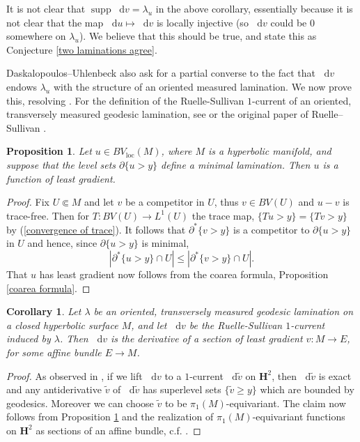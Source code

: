 \documentclass[reqno,12pt,letterpaper]{amsart}
\newcommand{\Hyp}{\mathbf H}
\DeclareMathOperator{\supp}{supp}
\newcommand*\dif{\mathop{}\!\mathrm{d}}
\newcommand{\loc}{\mathrm{loc}}
\newtheorem{proposition}[theorem]{Proposition}
\newtheorem{corollary}[theorem]{Corollary}
\theoremstyle{definition}
\numberwithin{equation}{section}
\begin{document}
It is not clear that $\supp \dif v = \lambda_u$ in the above corollary, essentially because it is not clear that the map $\dif u \mapsto \dif v$ is locally injective (so $\dif v$ could be $0$ somewhere on $\lambda_u$).
We believe that this should be true, and state this as Conjecture \ref{two laminations agree}.

Daskalopoulos--Uhlenbeck also ask for a partial converse to the fact that $\dif v$ endows $\lambda_u$ with the structure of an oriented measured lamination.
We now prove this, resolving \cite[Problem 9.7]{daskalopoulos2020transverse}.
For the definition of the Ruelle-Sullivan $1$-current of an oriented, transversely measured geodesic lamination, see \cite[\S8]{daskalopoulos2020transverse} or the original paper of Ruelle--Sullivan \cite{Ruelle75}.

\begin{proposition}\label{minimal bounding implies least gradient}
Let $u \in BV_\loc(M)$, where $M$ is a hyperbolic manifold, and suppose that the level sets $\partial \{u > y\}$ define a minimal lamination.
Then $u$ is a function of least gradient.
\end{proposition}
\begin{proof}
Fix $U \Subset M$ and let $v$ be a competitor in $U$, thus $v \in BV(U)$ and $u - v$ is trace-free.
Then for $T: BV(U) \to L^1(U)$ the trace map, $\{Tu > y\} = \{Tv > y\}$ by (\ref{convergence of trace}).
It follows that $\partial^* \{v > y\}$ is a competitor to $\partial \{u > y\}$ in $U$ and hence, since $\partial \{u > y\}$ is minimal,
$$|\partial^* \{u > y\} \cap U| \leq |\partial^* \{v > y\} \cap U|.$$
That $u$ has least gradient now follows from the coarea formula, Proposition \ref{coarea formula}.
\end{proof}

\begin{corollary}\label{ruelle sullivan antiderivative}
Let $\lambda$ be an oriented, transversely measured geodesic lamination on a closed hyperbolic surface $M$, and let $\dif v$ be the Ruelle-Sullivan $1$-current induced by $\lambda$.
Then $\dif v$ is the derivative of a section of least gradient $v: M \to E$, for some affine bundle $E \to M$.
\end{corollary}
\begin{proof}
As observed in \cite[\S9]{daskalopoulos2020transverse}, if we lift $\dif v$ to a $1$-current $\dif \tilde v$ on $\Hyp^2$, then $\dif \tilde v$ is exact and any antiderivative $\tilde v$ of $\dif \tilde v$ has superlevel sets $\{\tilde v \geq y\}$ which are bounded by geodesics.
Moreover we can choose $\tilde v$ to be $\pi_1(M)$-equivariant.
The claim now follows from Proposition \ref{minimal bounding implies least gradient} and the realization of $\pi_1(M)$-equivariant functions on $\Hyp^2$ as sections of an affine bundle, c.f. \cite[\S4]{daskalopoulos2020transverse}.
\end{proof}
\end{document}
